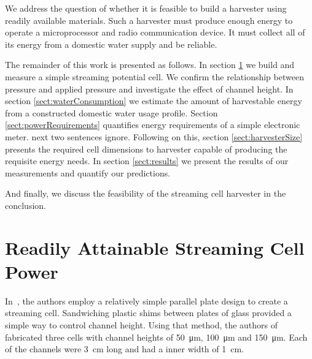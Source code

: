 \documentclass[10pt,final,journal]{IEEEtran}
\begin{document}
    We address the question of whether it is feasible to build a harvester using readily available materials.
    Such a harvester must produce enough energy to operate a microprocessor and radio communication device.
    It must collect all of its energy from a domestic water supply and be reliable.

    The remainder of this work is presented as follows.
    In section \ref{sect:streamingCell} we build and measure a simple streaming potential cell.
    We confirm the relationship between pressure and applied pressure and investigate the effect of channel height.
    In section \ref{sect:waterConsumption} we estimate the amount of harvestable energy from a constructed domestic water usage profile.
    Section \ref{sect:powerRequirements} quantifies energy requirements of a simple electronic meter.
    {\color{blue} next two sentences ignore.}
    Following on this, section \ref{sect:harvesterSize} presents the required cell dimensions to  harvester capable of producing the requisite energy needs.
    In section \ref{sect:results} we present the results of our measurements and quantify our predictions.


    And finally, we discuss the feasibility of the streaming cell harvester in the conclusion.

    \section{Readily Attainable Streaming Cell Power} \label{sect:streamingCell}
    In~\cite{Gu2000}, the authors employ a relatively simple parallel plate design to create a streaming cell.
    Sandwiching plastic shims between plates of glass provided a simple way to control channel height.
    Using that method, the authors of~\cite{Gu2000} fabricated three cells with channel heights of \SI{50}{\micro\metre}, \SI{100}{\micro\metre} and \SI{150}{\micro\metre}.
    Each of the channels were \SI{3}{\centi\metre} long and had a inner width of \SI{1}{\centi\metre}.
\end{document}
